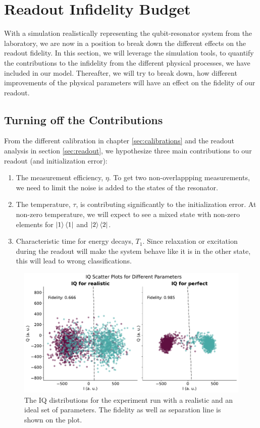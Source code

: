 

\chapter{Readout Infidelity Budget} \label{chap:readout_infidelity_budget}
With a simulation realistically representing the qubit-resonator system from the laboratory, we are now in a position to break down the different effects on the readout fidelity. In this section, we will leverage the simulation tools, to quantify the contributions to the infidelity from the different physical processes, we have included in our model. Thereafter, we will try to break down, how different improvements of the physical parameters will have an effect on the fidelity of our readout. 

\section{Turning off the Contributions}
From the different calibration in chapter \ref{sec:calibrations} and the readout analysis in section \ref{sec:readout}, we hypothesize three main contributions to our readout (and initialization error):
\begin{enumerate}
    \item The measurement efficiency, $\eta$. To get two non-overlappping measurements, we need to limit the noise is added to the states of the resonator. 
    \item The temperature, $\tau$, is contributing significantly to the initialization error. At non-zero temperature, we will expect to see a mixed state with non-zero elements for $\ket{1}\bra{1}$ and $\ket{2}\bra{2}$. 
    \item Characteristic time for energy decays, $T_1$. Since relaxation or excitation during the readout will make the system behave like it is in the other state, this will lead to wrong classifications.
\end{enumerate}


\begin{figure}
    \centering
    \includegraphics[]{Simulations/budgets/figures/iq_scatter_budgetting_on_off_two.pdf}
    \caption{The IQ distributions for the experiment run with a realistic and an ideal set of parameters. The fidelity as well as separation line is shown on the plot. }
    \label{fig:realistic_perfect_comparison}
\end{figure}

